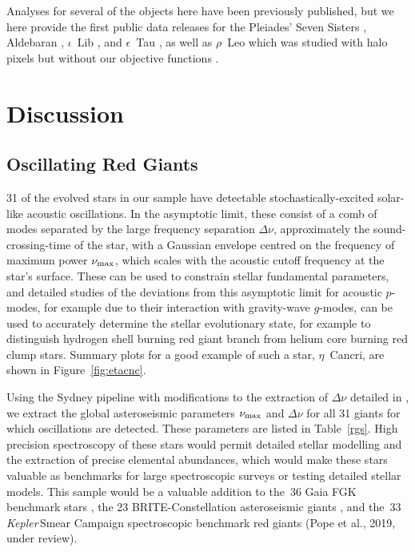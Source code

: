 \documentclass[modern]{aastex62}
\newcommand{\numax}{\mbox{$\nu_{\rm max}$}\xspace}
\newcommand{\Dnu}{\mbox{$\Delta \nu$}\xspace}
\newcommand\kepler{\emph{Kepler}\,}
\begin{document}


Analyses for several of the objects here have been previously published, but we here provide the first public data releases for the Pleiades' Seven Sisters \citep{White2017}, Aldebaran \citep{Farr2018}, $\iota$~Lib \citep{Buysschaert2018}, and $\epsilon$~Tau \citep{Arentoft2019}, as well as $\rho$~Leo which was studied with halo pixels but without our objective functions \citep{Aerts2018}.

\section{Discussion}
\label{sec:discussion}

\subsection{Oscillating Red Giants}
\label{sec:rgs}
31 of the evolved stars in our sample have detectable stochastically-excited solar-like acoustic oscillations. In the asymptotic limit, these consist of a comb of modes separated by the large frequency separation \Dnu, approximately the sound-crossing-time of the star, with a Gaussian envelope centred on the frequency of maximum power \numax, which scales with the acoustic cutoff frequency at the star's surface. These can be used to constrain stellar fundamental parameters, and detailed studies of the deviations from this asymptotic limit for acoustic $p$-modes, for example due to their interaction with gravity-wave $g$-modes, can be used to accurately determine the stellar evolutionary state, for example to distinguish hydrogen shell burning red giant branch from helium core burning red clump stars. Summary plots for a good example of such a star, $\eta$~Cancri, are shown in Figure~\ref{fig:etacnc}.

Using the Sydney pipeline \citep{Huber2009} with modifications to the extraction of \Dnu detailed in \citep{Yu2018}, we extract the global asteroseismic parameters \numax and \Dnu for all 31 giants for which oscillations are detected. These parameters are listed in Table~\ref{rgs}. High precision spectroscopy of these stars would permit detailed stellar modelling and the extraction of precise elemental abundances, which would make these stars valuable as benchmarks for large spectroscopic surveys or testing detailed stellar models. This sample would be a valuable addition to the~36 Gaia FGK benchmark stars \citep{gaiabenchmark1,gaiabenchmark3,2018RNAAS...2c.152J}, the 23 BRITE-Constellation asteroseismic giants \citep{Kallinger2019}, and the~33 \kepler Smear Campaign spectroscopic benchmark red giants (Pope et al., 2019, under review). 
\end{document}
